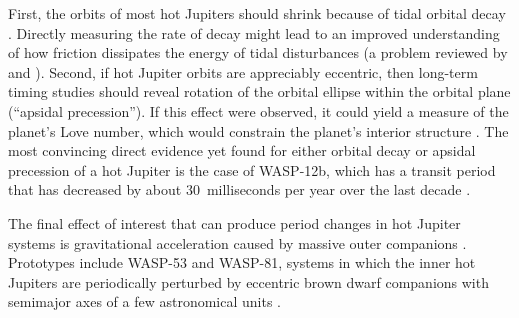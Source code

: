 \documentclass[12pt,twocolumn,tighten]{aastex62}
\begin{document}
{First, the orbits of most hot Jupiters should shrink because of tidal
orbital decay
\citep{counselman_outcomes_1973,hut_stability_1980,levrard_falling_2009,matsumura_tidal_2010}.
Directly measuring the rate of decay might lead to an improved
understanding of how friction dissipates the energy of tidal
disturbances (a problem reviewed by \citealt{Mazeh2008} and
\citealt{ogilvie_tidal_2014}). Second, if hot Jupiter orbits are appreciably eccentric, then long-term
timing studies should reveal rotation of the orbital ellipse within
the orbital plane (``apsidal precession'').  If this effect were
observed, it could yield a measure of the planet's Love number, which
would constrain the planet's interior structure
\citep{ragozzine_probing_2009}.
The most convincing direct evidence yet found for either orbital decay
or apsidal precession of a hot Jupiter is the case of WASP-12b, which
has a transit period that has decreased by about 30~milliseconds per
year over the last decade
\citep{maciejewski_departure_2016,patra_2017}.

The final effect of interest that can produce period changes in hot
Jupiter systems is gravitational acceleration caused by massive outer
companions \citep[{\it e.g.},][Section~4]{agol_detecting_2005}.
Prototypes include WASP-53 and WASP-81, systems in which the inner hot
Jupiters are periodically perturbed by eccentric brown dwarf
companions with semimajor axes of a few astronomical units
\citep{triaud_peculiar_2017}.

}
\end{document}
